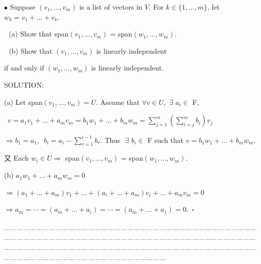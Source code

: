 \documentclass[a4paper, 11pt, UTF8]{article}
\begin{document}
\begin{large}
{\small $\bullet$} {\timessl\Large 
Suppose $(v_1,\dots,v_m)$ is a list of vectors in $V$. For $k\in\{1,\dots,m\}$, let $w_k=v_1+\dots+v_k$.}\par\,\,
(a) {\timessl\Large Show that span$(v_1,\dots,v_m)$ = span$(w_1,\dots,w_m)$.}\par\,\,
(b) {\timessl\Large Show that $(v_1,\dots,v_m)$ is linearly independent}\par\qquad
{\timessl\Large if and only if $(w_1,\dots,w_m)$ is linearly independent.
}\par
{\timesbf S\footnotesize{OLUTION:}}\par\quad
(a) Let span$(v_1,\dots,v_m)=U$. Assume that $\forall v\in U,\,\,\exists\,\,a_i\in$ {\timesbf F},\par\qquad\,
$v=a_1 v_1+\dots+a_m v_m=b_1 w_1+\dots+b_m w_m=\sum\limits_{j=1}^m(\sum\limits_{i=j}^m b_i)v_j$\par\qquad
$\Rightarrow b_1=a_1,\,\,\,b_i=a_i-\sum\limits_{r=1}^{i-1} b_r.$ Thus $\,\,\exists\,\,b_i\in$ {\timesbf F} such that $v=b_1 w_1+\dots+b_m w_m$.\par\qquad
又 Each $w_i\in U\Rightarrow$ span$(v_1,\dots,v_m)$ = span$(w_1,\dots,w_m)$.\par\quad
(b) $a_1 w_1+\dots+a_m w_m=0$\par\quad
$\Rightarrow (a_1+\dots+a_m)v_1+\dots+(a_i+\dots+a_m)v_i+\dots+a_m v_m=0$\par\quad
$\Rightarrow a_m=\cdots=(a_m+\dots+a_i)=\cdots=(a_m+\dots+a_1)=0.\,\,\,\square$\par
{\tiny \_\,\_\,\_\,\_\,\_\,\_\,\_\,\_\,\_\,\_\,\_\,\_\,\_\,\_\,\_\,\_\,\_\,\_\,\_\,\_\,\_\,\_\,\_\,\_\,\_\,\_\,\_\,\_\,\_\,\_\,\_\,\_\,\_\,\_\,\_\,\_\,\_\,\_\,\_\,\_\,\_\,\_\,\_\,\_\,\_\,\_\,\_\,\_\,\_\,\_\,\_\,\_\,\_\,\_\,\_\,\_\,\_\,\_\,\_\,\_\,\_\,\_\,\_\,\_\,\_\,\_\,\_\,\_\,\_\,\_\,\_\_\,\_\,\_\,\_\,\_\,\_\,\_\,\_\,\_\,\_\,\_\,\_\,\_\,\_\,\_\,\_\,\_\,\_\,\_\,\_\,\_\,\_\,\_\,\_\,\_\,\_\,\_\,\_\,\_\,\_\,\_\,\_\,\_\,\_\,\_\,\_\,\_\,\_\,\_\,\_\,\_\,\_\,\_\,\_\,\_\,\_\,\_\,\_\,\_\,\_\,\_\,\_\,\_\,\_\,\_\,\_\,\_\,\_\,\_\,\_\,\_\,\_\,\_\,\_\,\_\,\_\,\_\,\_\,\_\,\_\,\_}\par


\end{large}
\end{document}
